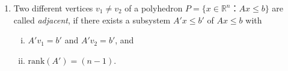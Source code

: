 \documentclass[11pt]{article}
\newcommand{\setR}{\mathbb{R}}
\renewcommand{\leq}{\leqslant}
\renewcommand{\geq}{\geqslant}
\newcommand{\rank}{\mathrm{rank}}
\begin{document}
\begin{enumerate}[1)]
  
  
  
  
  
  
  


\item \label{item:11} Two different vertices $v_1 ≠ v_2$ of a polyhedron $P = \{ x ∈ ℝ^n ： Ax≤b\}$ are called \emph{adjacent}, if there exists a subsystem $A'x ≤ b'$ of $Ax≤b$ with
  \begin{enumerate}[i)] 
  \item $A'v_1 = b'$ and $A'v_2 = b'$, and
  \item $\rank(A') = (n-1)$. 
  \end{enumerate}


\end{enumerate}
\end{document}
